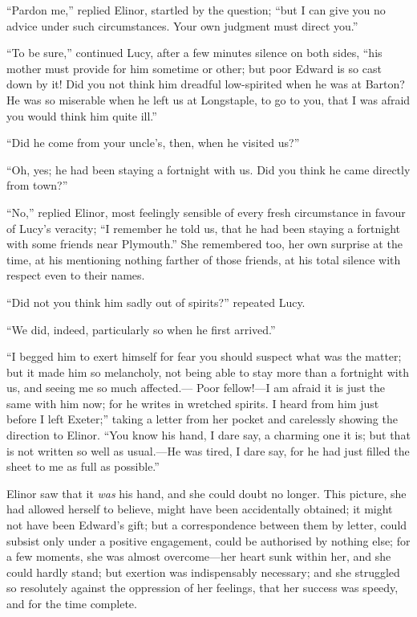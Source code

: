 \documentclass{article}
\begin{document}
``Pardon me,'' replied Elinor, startled by the question;
``but I can give you no advice under such circumstances.
Your own judgment must direct you.''

``To be sure,'' continued Lucy, after a few minutes
silence on both sides, ``his mother must provide for him
sometime or other; but poor Edward is so cast down by it!
Did you not think him dreadful low-spirited when he was at
Barton?  He was so miserable when he left us at Longstaple,
to go to you, that I was afraid you would think him quite ill.''

``Did he come from your uncle's, then, when he visited us?''

``Oh, yes; he had been staying a fortnight with us.
Did you think he came directly from town?''

``No,'' replied Elinor, most feelingly sensible of
every fresh circumstance in favour of Lucy's veracity;
``I remember he told us, that he had been staying
a fortnight with some friends near Plymouth.''
She remembered too, her own surprise at the time,
at his mentioning nothing farther of those friends,
at his total silence with respect even to their names.

``Did not you think him sadly out of spirits?''
repeated Lucy.

``We did, indeed, particularly so when he first arrived.''

``I begged him to exert himself for fear you
should suspect what was the matter; but it made him
so melancholy, not being able to stay more than a
fortnight with us, and seeing me so much affected.---%
Poor fellow!---I am afraid it is just the same with him now;
for he writes in wretched spirits.  I heard from him just
before I left Exeter;'' taking a letter from her pocket
and carelessly showing the direction to Elinor.
``You know his hand, I dare say, a charming one it is;
but that is not written so well as usual.---He was tired,
I dare say, for he had just filled the sheet to me as full
as possible.''

Elinor saw that it \emph{was} his hand, and she could doubt
no longer.  This picture, she had allowed herself to believe,
might have been accidentally obtained; it might not have
been Edward's gift; but a correspondence between them
by letter, could subsist only under a positive engagement,
could be authorised by nothing else; for a few moments, she
was almost overcome---her heart sunk within her, and she could
hardly stand; but exertion was indispensably necessary;
and she struggled so resolutely against the oppression
of her feelings, that her success was speedy, and for
the time complete.
\end{document}
